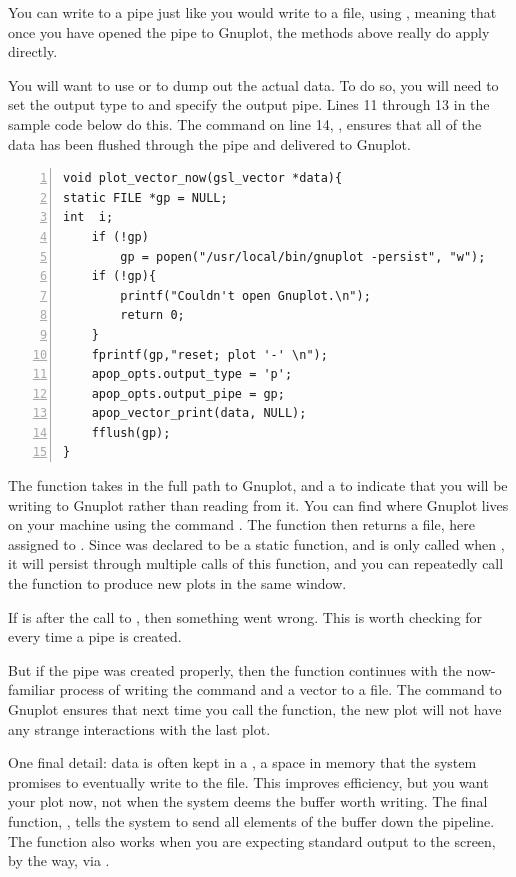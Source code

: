 You can write to a pipe just like you would write to a file, using
, meaning that once you have opened the pipe to
Gnuplot, the methods above really do apply directly.

You will want to use  or
 to dump out the actual data. To do so, you
will need to set the output type to  and specify the output
pipe. Lines 11 through 13 in the sample code below do this.
The command on line 14, , ensures that all of the data has
been flushed through the pipe and delivered to Gnuplot.

\label{pipeexample}
\begin{lstlisting}[numbers=left, numberstyle=\scshape]
void plot_vector_now(gsl_vector *data){
static FILE *gp = NULL;
int  i;
    if (!gp)
        gp = popen("/usr/local/bin/gnuplot -persist", "w");
    if (!gp){
        printf("Couldn't open Gnuplot.\n");
        return 0;
    }
    fprintf(gp,"reset; plot '-' \n");
    apop_opts.output_type = 'p';
    apop_opts.output_pipe = gp;
    apop_vector_print(data, NULL);
    fflush(gp);
}
\end{lstlisting} 

The  function takes in the full path to Gnuplot, and a 
to indicate that you will be writing to Gnuplot rather than reading from
it. You can find where Gnuplot lives on your machine using the command
. The  function then returns a file, here
assigned to . Since  was declared to be a static function,
and  is only called when ,
it will persist through multiple calls of this function, and you can
repeatedly call the function to produce new plots in the same window.

If  is  after the call to , then something
went wrong.  This is worth checking for every time a pipe is created.

But if the pipe was created
properly, then the function continues with the now-familiar process of
writing the command  and a vector to a file. The 
command to Gnuplot ensures that next time you call the function, the new
plot will not have any strange interactions with the last plot.

One final detail: data is often kept in a , a space in
memory that the system promises to eventually write to the file. This
improves efficiency, but you want your plot now, not when the system
deems the buffer worth writing.  The final
function, , tells the system to send all elements of the
 buffer down the pipeline. The function also works when you are
expecting standard
output to the screen, by the way, via .

